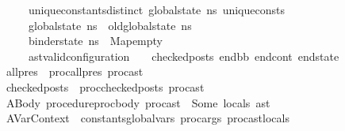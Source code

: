 \begin{isabellebody}
\ \ \ \ \ \ \ \ \ \ \ {\isacharparenleft}{\kern0pt}unique{\isacharunderscore}{\kern0pt}constants{\isacharunderscore}{\kern0pt}distinct\ {\isacharparenleft}{\kern0pt}global{\isacharunderscore}{\kern0pt}state\ ns{\isacharparenright}{\kern0pt}\ unique{\isacharunderscore}{\kern0pt}consts{\isacharparenright}{\kern0pt}\ {\isasymLongrightarrow}\isanewline
\ \ \ \ \ \ \ \ \ \ \ {\isacharparenleft}{\kern0pt}{\isacharparenleft}{\kern0pt}global{\isacharunderscore}{\kern0pt}state\ ns{\isacharparenright}{\kern0pt}\ {\isacharequal}{\kern0pt}\ {\isacharparenleft}{\kern0pt}old{\isacharunderscore}{\kern0pt}global{\isacharunderscore}{\kern0pt}state\ ns{\isacharparenright}{\kern0pt}{\isacharparenright}{\kern0pt}\ {\isasymLongrightarrow}\isanewline
\ \ \ \ \ \ \ \ \ \ \ {\isacharparenleft}{\kern0pt}{\isacharparenleft}{\kern0pt}binder{\isacharunderscore}{\kern0pt}state\ ns{\isacharparenright}{\kern0pt}\ {\isacharequal}{\kern0pt}\ Map{\isachardot}{\kern0pt}empty{\isacharparenright}{\kern0pt}\ {\isasymLongrightarrow}\ \isanewline
\ \ \ \ \ \ \ \ \ \ \ {\isacharparenleft}{\kern0pt}ast{\isacharunderscore}{\kern0pt}valid{\isacharunderscore}{\kern0pt}configuration\ {\isasymLambda}\ {\isasymGamma}\ {\isacharbrackleft}{\kern0pt}{\isacharbrackright}{\kern0pt}\ checked{\isacharunderscore}{\kern0pt}posts\ end{\isacharunderscore}{\kern0pt}bb\ end{\isacharunderscore}{\kern0pt}cont\ end{\isacharunderscore}{\kern0pt}state{\isacharparenright}{\kern0pt}{\isachardoublequoteclose}\isanewline
\ \ \ \ \ \ \ {\isachardoublequoteopen}all{\isacharunderscore}{\kern0pt}pres\ {\isacharequal}{\kern0pt}\ proc{\isacharunderscore}{\kern0pt}all{\isacharunderscore}{\kern0pt}pres\ proc{\isacharunderscore}{\kern0pt}ast{\isachardoublequoteclose}\isanewline
\ \ \ \ \ \ \ {\isachardoublequoteopen}checked{\isacharunderscore}{\kern0pt}posts\ {\isacharequal}{\kern0pt}\ proc{\isacharunderscore}{\kern0pt}checked{\isacharunderscore}{\kern0pt}posts\ proc{\isacharunderscore}{\kern0pt}ast{\isachardoublequoteclose}\isanewline
\ \ \ \ \ \ \ ABody{\isacharcolon}{\kern0pt}\ {\isachardoublequoteopen}procedure{\isachardot}{\kern0pt}proc{\isacharunderscore}{\kern0pt}body\ proc{\isacharunderscore}{\kern0pt}ast\ {\isacharequal}{\kern0pt}\ Some\ {\isacharparenleft}{\kern0pt}locals{\isacharcomma}{\kern0pt}\ ast{\isacharparenright}{\kern0pt}{\isachardoublequoteclose}\isanewline
\ \ \ \ \ \ \ AVarContext{\isacharcolon}{\kern0pt}{\isachardoublequoteopen}{\isasymLambda}\ {\isacharequal}{\kern0pt}\ {\isacharparenleft}{\kern0pt}constants{\isacharat}{\kern0pt}global{\isacharunderscore}{\kern0pt}vars{\isacharcomma}{\kern0pt}\ {\isacharparenleft}{\kern0pt}proc{\isacharunderscore}{\kern0pt}args\ proc{\isacharunderscore}{\kern0pt}ast{\isacharparenright}{\kern0pt}{\isacharat}{\kern0pt}locals{\isacharparenright}{\kern0pt}{\isachardoublequoteclose}\isanewline

\end{isabellebody}
